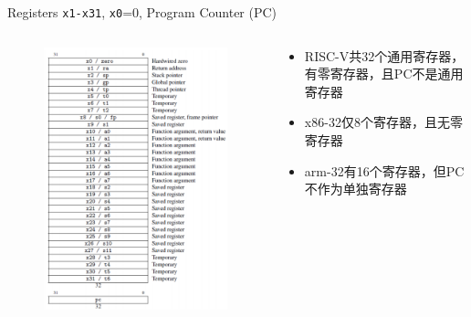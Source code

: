 \documentclass{myslide}
\begin{document}
\begin{frame}[fragile]{Registers}
\verb'x1-x31', \verb'x0'=0, Program Counter (PC)
\begin{columns}
\begin{column}{0.3\linewidth}
\begin{figure}
\centering
\includegraphics[width=\linewidth]{fig/Lecture2/general_registers.PNG}
\end{figure}
\end{column}
\begin{column}{0.6\linewidth}
\begin{itemize}
	\item RISC-V共32个通用寄存器，有零寄存器，且PC不是通用寄存器
	\item x86-32仅8个寄存器，且无零寄存器
	\item arm-32有16个寄存器，但PC不作为单独寄存器
\end{itemize}
\end{column}
\end{columns}
\end{frame}
\end{document}
